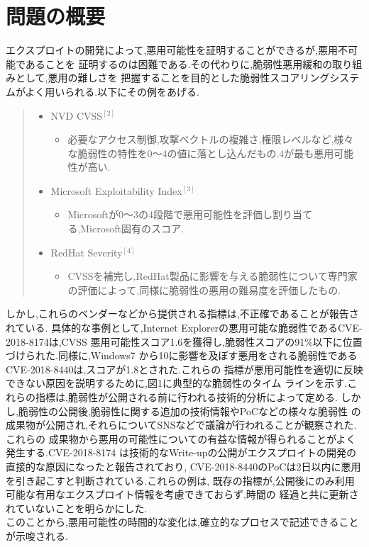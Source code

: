 \documentclass[submit,techreq,noauthor]{eco}	%
\begin{document}
\section{問題の概要}
エクスプロイトの開発によって,悪用可能性を証明することができるが,悪用不可能であることを
証明するのは困難である.その代わりに,脆弱性悪用緩和の取り組みとして,悪用の難しさを
把握することを目的とした脆弱性スコアリングシステムがよく用いられる.以下にその例をあげる.
\begin{quote}
  \begin{itemize}
   \item NVD CVSS\begin{math}^{[2]}\end{math}
    \begin{itemize}
      \item 必要なアクセス制御,攻撃ベクトルの複雑さ,権限レベルなど,様々な脆弱性の特性を0～4の値に落とし込んだもの.4が最も悪用可能性が高い.
    \end{itemize}
   \item Microsoft Exploitability Index\begin{math}^{[3]}\end{math}
    \begin{itemize}
      \item Microsoftが0〜3の4段階で悪用可能性を評価し割り当てる,Microsoft固有のスコア.
    \end{itemize}
   \item RedHat Severity\begin{math}^{[4]}\end{math}
    \begin{itemize}
      \item CVSSを補完し,RedHat製品に影響を与える脆弱性について専門家の評価によって,同様に脆弱性の悪用の難易度を評価したもの.
    \end{itemize}
  \end{itemize}
\end{quote}
しかし,これらのベンダーなどから提供される指標は,不正確であることが報告されている.
具体的な事例として,Internet Explorerの悪用可能な脆弱性であるCVE-2018-8174は,CVSS
悪用可能性スコア1.6を獲得し,脆弱性スコアの91\%以下に位置づけられた.同様に,Windows7
から10に影響を及ぼす悪用をされる脆弱性であるCVE-2018-8440は,スコアが1.8とされた.これらの
指標が悪用可能性を適切に反映できない原因を説明するために,図1に典型的な脆弱性のタイム
ラインを示す.これらの指標は,脆弱性が公開される前に行われる技術的分析によって定める.
しかし,脆弱性の公開後,脆弱性に関する追加の技術情報やPoCなどの様々な脆弱性
の成果物が公開され,それらについてSNSなどで議論が行われることが観察された.これらの
成果物から悪用の可能性についての有益な情報が得られることがよく発生する.CVE-2018-8174
は技術的なWrite-upの公開がエクスプロイトの開発の直接的な原因になったと報告されており,
CVE-2018-8440のPoCは2日以内に悪用を引き起こすと判断されている.これらの例は,
既存の指標が,公開後にのみ利用可能な有用なエクスプロイト情報を考慮できておらず,時間の
経過と共に更新されていないことを明らかにした.\\
\indent このことから,悪用可能性の時間的な変化は,確立的なプロセスで記述できることが示唆される.
\end{document}
